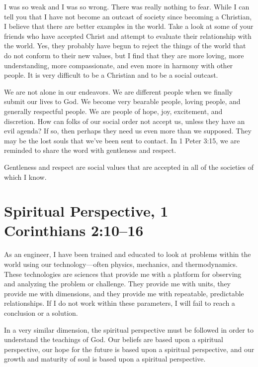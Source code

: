 \documentclass[12pt]{memoir}
\begin{document}
I was so weak and I was so wrong. There was really nothing to fear.
While I can tell you that I have not become an outcast of society since becoming a Christian, I believe that there are better examples
in the world. Take a look at some of your friends who have accepted
Christ and attempt to evaluate their relationship with the world.
Yes, they probably have begun to reject the things of the world that do not conform to their new values, but I find that they are
more loving, more understanding, more compassionate, and even more
in harmony with other people. It is very difficult to be a Christian
and to be a social outcast. 

We are not alone in our endeavors. We are different people when we
finally submit our lives to God. We become very bearable people, loving
people, and generally respectful people. We are people of hope, joy,
excitement, and discretion. How can folks of our social order not
accept us, unless they have an evil agenda? If so, then perhaps they
need us even more than we supposed. They may be the lost souls that
we've been sent to contact. In 1 Peter 3:15, we are reminded to share
the word with gentleness and respect.

Gentleness and respect are social values that are accepted in all of the societies of which I know. 

\section[Spiritual Perspective]{Spiritual Perspective, 1 Corinthians 2:10--16}

As an engineer, I have been trained and educated to look at problems
within the world using our technology---often physics, mechanics, and thermodynamics. These technologies are sciences that provide me
with a platform for observing and analyzing the problem or challenge.
They provide me with units, they provide me with dimensions, and they
provide me with repeatable, predictable relationships. If I do not work within these parameters, I will fail to reach a conclusion
or a solution. 

In a very similar dimension, the spiritual perspective must be followed
in order to understand the teachings of God. Our beliefs are based
upon a spiritual perspective, our hope for the future is based upon
a spiritual perspective, and our growth and maturity of soul is based
upon a spiritual perspective.
\end{document}
